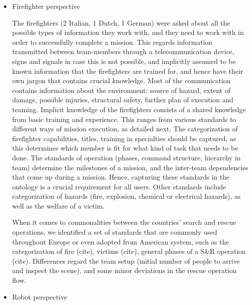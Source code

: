 \begin{itemize}
\begin{itemize}
\item Firefighter perspective

The firefighters (2 Italian, 1 Dutch, 1 German) were asked about all the possible types of information they work with, and they need to work with in order to successfully complete a mission. This regards information transmitted between team-members through a telecommunication device, signs and signals in case this is not possible, and implicitly assumed to be known information that the firefighters are trained for, and hence have their own jargon that contains crucial knowledge.
Most of the communication contains information about the environment: source of hazard, extent of damage, possible injuries, structural safety, further plan of execution and teaming. 
Implicit knowledge of the firefighters consists of a shared knowledge from basic training and experience. This ranges from various standards to different ways of mission execution, as detailed next.
The categorization of firefighter capabilities, titles, training in specialties should be captured, as this determines which member is fit for what kind of task that needs to be done. The standards of operation (phases, command structure, hierarchy in team) determine the milestones of a mission, and the inter-team dependencies that come up during a mission. Hence, capturing these standards in the ontology is a crucial requirement for all users. Other standards include categorization of hazards (fire, explosion, chemical or electrical hazards), as well as the welfare of a victim.

When it comes to commonalities between the countries' search and rescue operations, we identified a set of standards that are commonly used throughout Europe or even adopted from American system, such as the categorization of fire (cite), victims (cite), general phases of a S&R operation (cite). Differences regard the team setup (initial number of people to arrive and inspect the scene), and some minor deviations in the rescue operation flow.

\item Robot perspective


\end{itemize}
\end{itemize}
